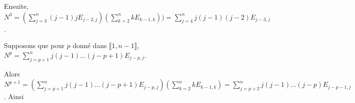 {{Ensuite, $N^3=\left(\sum_{j=3}^{n}(j-1)jE_{j-2,j}\right)\left(\sum_{k=2}^{n}kE_{k-1,k}\right)) =\sum_{j=4}^{n}j(j-1)(j-2)E_{j-3,j}$.

Supposons que pour $p$ donné dans $\llbracket1,n-1\rrbracket$, $N^p=\sum_{j=p+1}^{n}j(j-1)...(j-p+1)E_{j-p,j}$.

Alors $N^{p+1}=\left(\sum_{j=p+1}^{n}j(j-1)...(j-p+1)E_{j-p,j}\right)\left(\sum_{k=2}^{n}kE_{k-1,k}\right)=\sum_{j=p+2}^{n}j(j-1)...(j-p)E_{j-p-1,j}$. Ainsi 

\begin{center}
\end{center}
}
}
